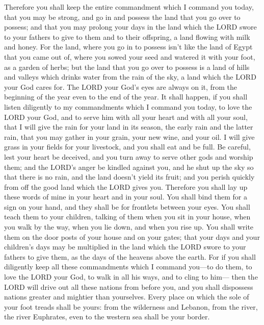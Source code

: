 \myverse{}Therefore you shall keep the entire commandment which I command
you today, that you may be strong, and go in and possess the land that you go over to possess;
\myverse{}and that you may prolong your days in the land which the LORD swore to your
fathers to give to them and to their offspring, a land flowing with milk and honey.
\myverse{}For the land, where you go in to possess isn’t like the land of Egypt that
you came out of, where you sowed your seed and watered it with your foot, as a garden of herbs;
\myverse{}but the land that you go over to possess is a land of hills and valleys which
drinks water from the rain of the sky,
\myverse{}a land which the LORD your God cares for. The LORD your God’s eyes are always
on it, from the beginning of the year even to the end of the year.
\myverse{}It shall happen, if you shall listen diligently to my commandments which
I command you today, to love the LORD your God, and to serve him with all your heart and with all your
soul,
\myverse{}that I will give the rain for your land in its season, the early rain and
the latter rain, that you may gather in your grain, your new wine, and your oil.
\myverse{}I will give grass in your fields for your livestock, and you shall eat and
be full.
\myverse{}Be careful, lest your heart be deceived, and you turn away to serve other
gods and worship them;
\myverse{}and the LORD’s anger be kindled against you, and he shut up the sky so that
there is no rain, and the land doesn’t yield its fruit; and you perish quickly from off the good land
which the LORD gives you.
\myverse{}Therefore you shall lay up these words of mine in your heart and in your
soul. You shall bind them for a sign on your hand, and they shall be for frontlets between your eyes.
\myverse{}You shall teach them to your children, talking of them when you sit in your
house, when you walk by the way, when you lie down, and when you rise up.
\myverse{}You shall write them on the door posts of your house and on your gates;
\myverse{}that your days and your children’s days may be multiplied in the land which
the LORD swore to your fathers to give them, as the days of the heavens above the earth.
\myverse{}For if you shall diligently keep all these commandments which I command you—to
do them, to love the LORD your God, to walk in all his ways, and to cling to him—
\myverse{}then the LORD will drive out all these nations from before you, and you shall
dispossess nations greater and mightier than yourselves.
\myverse{}Every place on which the sole of your foot treads shall be yours: from the
wilderness and Lebanon, from the river, the river Euphrates, even to the western sea shall be your border.
